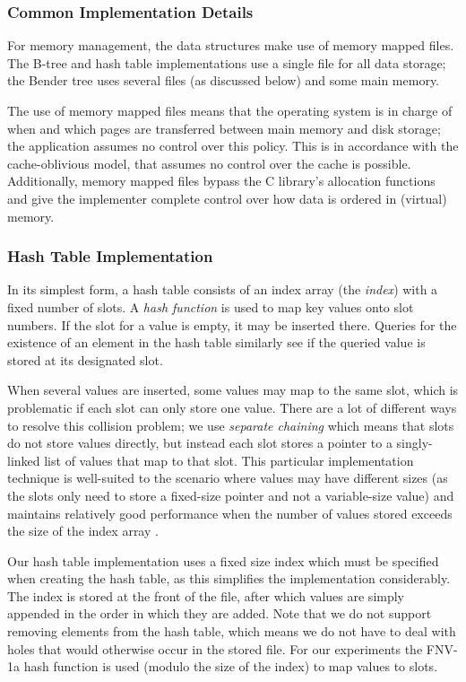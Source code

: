 \documentclass{acm_proc_article-sp}
\begin{document}
\subsubsection{Common Implementation Details}
For memory management, the data structures make use of memory mapped files.
The B-tree and hash table implementations use a single file for all data storage;
the Bender tree uses several files (as discussed below) and some main memory.

The use of memory mapped files means that the operating system is in charge of
when and which pages are transferred between main memory and disk storage; the
application assumes no control over this policy. This is in accordance with the
cache-oblivious model, that assumes no control over the cache is possible.
Additionally, memory mapped files bypass the C library's allocation functions
and give the implementer complete control over how data is ordered in (virtual)
memory.

\subsubsection{Hash Table Implementation}
In its simplest form, a hash table consists of an
index array (the \emph{index}) with a fixed number of slots. A \emph{hash
function} is used to map key values onto slot numbers. If the slot for a value
is empty, it may be inserted there. Queries for the existence of an element in
the hash table similarly see if the queried value is stored at its designated
slot.

When several values are inserted, some values may map to the same slot,
which is problematic if each slot can only store one value. There
are a lot of different ways to resolve this collision problem; we use
\emph{separate chaining} which means that slots do not store values directly,
but instead each slot stores a pointer to a singly-linked list of values that
map to that slot. This particular implementation technique is well-suited to
the scenario where values may have different sizes (as the slots only need to
store a fixed-size pointer and not a variable-size value) and maintains
relatively good performance when the number of values stored exceeds the size
of the index array \cite{sedgewick1998ac}.


Our hash table implementation uses a fixed size index which must be specified
when creating the hash table, as this simplifies the implementation
considerably. The index is stored at the front of the file, after which values
are simply appended in the order in which they are added. Note that we do not
support removing elements from the hash table, which means we do not have to
deal with holes that would otherwise occur in the stored file. For our
experiments the FNV-1a hash function \cite{noll2004fnv} is used (modulo the
size of the index) to map values to slots.
\end{document}
